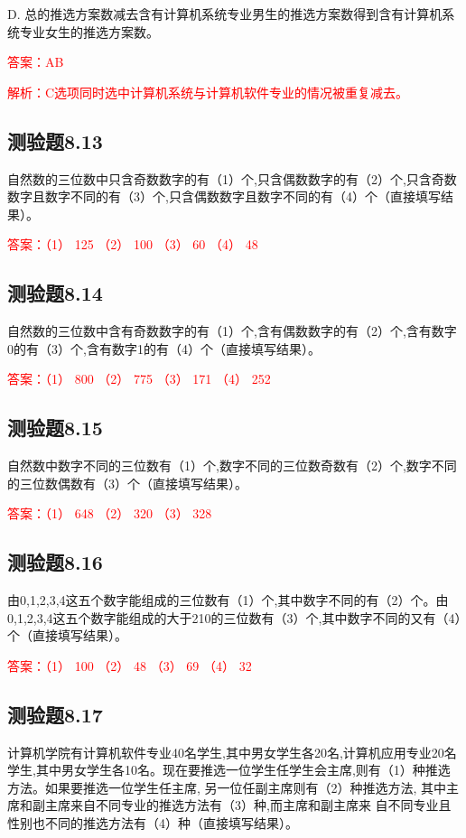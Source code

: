 \documentclass[UTF8, heading=true]{ctexart}
\begin{document}
D. 总的推选方案数减去含有计算机系统专业男生的推选方案数得到含有计算机系统专业女生的推选方案数。

\textcolor{red}{答案：AB}

\textcolor{red}{解析：C选项同时选中计算机系统与计算机软件专业的情况被重复减去。}

\subsection{测验题8.13}

自然数的三位数中只含奇数数字的有（1）个,只含偶数数字的有（2）个,只含奇数数字且数字不同的有（3）个,只含偶数数字且数字不同的有（4）个（直接填写结果）。

\textcolor{red}{答案：（1） 125 （2） 100 （3） 60 （4） 48}


\subsection{测验题8.14}
自然数的三位数中含有奇数数字的有（1）个,含有偶数数字的有（2）个,含有数字0的有（3）个,含有数字1的有（4）个（直接填写结果）。

\textcolor{red}{答案：（1） 800 （2） 775 （3） 171 （4） 252}

\subsection{测验题8.15}

自然数中数字不同的三位数有（1）个,数字不同的三位数奇数有（2）个,数字不同的三位数偶数有（3）个（直接填写结果）。

\textcolor{red}{答案：（1） 648 （2） 320 （3） 328}

\subsection{测验题8.16}

由0,1,2,3,4这五个数字能组成的三位数有（1）个,其中数字不同的有（2）个。由0,1,2,3,4这五个数字能组成的大于210的三位数有（3）个,其中数字不同的又有（4）个（直接填写结果）。

\textcolor{red}{答案：（1） 100 （2） 48 （3） 69 （4） 32}

\subsection{测验题8.17}

计算机学院有计算机软件专业40名学生,其中男女学生各20名,计算机应用专业20名学生,其中男女学生各10名。现在要推选一位学生任学生会主席,则有（1）种推选方法。如果要推选一位学生任主席,
另一位任副主席则有（2）种推选方法,
其中主席和副主席来自不同专业的推选方法有（3）种,而主席和副主席来
自不同专业且性别也不同的推选方法有（4）种（直接填写结果）。
\end{document}
